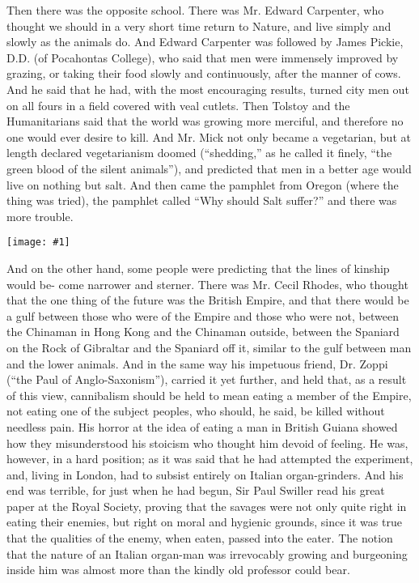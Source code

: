 \documentclass{book}
\newcommand\mdstandaloneimage[1]{
  \begin{center}
    \texttt{[image: \#1]}
  \end{center}
}
\begin{document}
Then there was the opposite school. There was Mr. Edward Carpenter, who thought we should in a very short time return to Nature, and live simply and slowly as the animals do. And Edward Carpenter was followed by James Pickie, D.D. (of Pocahontas College), who said that men were immensely improved by grazing, or taking their food slowly and continuously, after the manner of cows. And he said that he had, with the most encouraging results, turned city men out on all fours in a field covered with veal cutlets. Then Tolstoy and the Humanitarians said that the world was growing more merciful, and therefore no one would ever desire to kill. And Mr. Mick not only became a vegetarian, but at length declared vegetarianism doomed (“shedding,” as he called it finely, “the green blood of the silent animals”), and predicted that men in a better age would live on nothing but salt. And then came the pamphlet from Oregon (where the thing was tried), the pamphlet called “Why should Salt suffer?” and there was more trouble.

\mdstandaloneimage{images/image_0.png}
And on the other hand, some people were predicting that the lines of kinship would be- come narrower and sterner. There was Mr. Cecil Rhodes, who thought that the one thing of the future was the British Empire, and that there would be a gulf between those who were of the Empire and those who were not, between the Chinaman in Hong Kong and the Chinaman outside, between the Spaniard on the Rock of Gibraltar and the Spaniard off it, similar to the gulf between man and the lower animals. And in the same way his impetuous friend, Dr. Zoppi (“the Paul of Anglo-Saxonism”), carried it yet further, and held that, as a result of this view, cannibalism should be held to mean eating a member of the Empire, not eating one of the subject peoples, who should, he said, be killed without needless pain. His horror at the idea of eating a man in British Guiana showed how they misunderstood his stoicism who thought him devoid of feeling. He was, however, in a hard position; as it was said that he had attempted the experiment, and, living in London, had to subsist entirely on Italian organ-grinders. And his end was terrible, for just when he had begun, Sir Paul Swiller read his great paper at the Royal Society, proving that the savages were not only quite right in eating their enemies, but right on moral and hygienic grounds, since it was true that the qualities of the enemy, when eaten, passed into the eater. The notion that the nature of an Italian organ-man was irrevocably growing and burgeoning inside him was almost more than the kindly old professor could bear.
\end{document}
